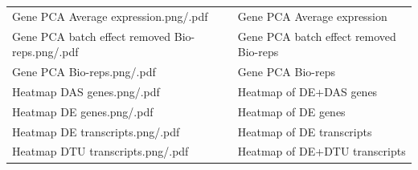 \documentclass[]{article}
\begin{document}
\begin{longtable}[]{@{}ll@{}}
\begin{minipage}[t]{0.51\columnwidth}
Gene PCA Average expression.png/.pdf\strut
\end{minipage} & \begin{minipage}[t]{0.43\columnwidth}\raggedright\strut
Gene PCA Average expression\strut
\end{minipage}\tabularnewline
\begin{minipage}[t]{0.51\columnwidth}\raggedright\strut
Gene PCA batch effect removed Bio-reps.png/.pdf\strut
\end{minipage} & \begin{minipage}[t]{0.43\columnwidth}\raggedright\strut
Gene PCA batch effect removed Bio-reps\strut
\end{minipage}\tabularnewline
\begin{minipage}[t]{0.51\columnwidth}\raggedright\strut
Gene PCA Bio-reps.png/.pdf\strut
\end{minipage} & \begin{minipage}[t]{0.43\columnwidth}\raggedright\strut
Gene PCA Bio-reps\strut
\end{minipage}\tabularnewline
\begin{minipage}[t]{0.51\columnwidth}\raggedright\strut
Heatmap DAS genes.png/.pdf\strut
\end{minipage} & \begin{minipage}[t]{0.43\columnwidth}\raggedright\strut
Heatmap of DE+DAS genes\strut
\end{minipage}\tabularnewline
\begin{minipage}[t]{0.51\columnwidth}\raggedright\strut
Heatmap DE genes.png/.pdf\strut
\end{minipage} & \begin{minipage}[t]{0.43\columnwidth}\raggedright\strut
Heatmap of DE genes\strut
\end{minipage}\tabularnewline
\begin{minipage}[t]{0.51\columnwidth}\raggedright\strut
Heatmap DE transcripts.png/.pdf\strut
\end{minipage} & \begin{minipage}[t]{0.43\columnwidth}\raggedright\strut
Heatmap of DE transcripts\strut
\end{minipage}\tabularnewline
\begin{minipage}[t]{0.51\columnwidth}\raggedright\strut
Heatmap DTU transcripts.png/.pdf\strut
\end{minipage} & \begin{minipage}[t]{0.43\columnwidth}\raggedright\strut
Heatmap of DE+DTU transcripts\strut
\end{minipage}\tabularnewline

\end{longtable}
\end{document}

